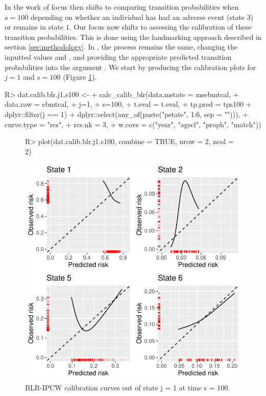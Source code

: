 \documentclass[nojss]{jss}
\begin{document}
In the work of \cite{DeWreede2011} focus then shifts to comparing transition probabilities when $s = 100$ depending on whether an individual has had an adverse event (state $3$) or remains in state $1$. Our focus now shifts to assessing the calibration of these transition probabilities. This is done using the landmarking approach described in section \ref{sec:methodology}. In , the process remains the same, changing the inputted values  and , and providing the appropriate predicted transition probabilities into the argument . We start by producing the calibration plots for $j = 1$ and $s = 100$ (Figure \ref{fig:blrj1s100}).

\begin{Schunk}
\begin{Sinput}
R> dat.calib.blr.j1.s100 <-
+    calc_calib_blr(data.mstate = msebmtcal,
+                   data.raw = ebmtcal,
+                   j=1,
+                   s=100,
+                   t.eval = t.eval,
+                   tp.pred = tps100 %
+                     dplyr::filter(j == 1) %
+                     dplyr::select(any_of(paste("pstate", 1:6, sep = ""))),
+                   curve.type = "rcs",
+                   rcs.nk = 3,
+                   w.covs = c("year", "agecl", "proph", "match"))
\end{Sinput}
\end{Schunk}

\begin{figure}
\centering
\begin{Schunk}
\begin{Sinput}
R> plot(dat.calib.blr.j1.s100, combine = TRUE, nrow = 2, ncol = 2)
\end{Sinput}
\end{Schunk}
\includegraphics{overview-010}
\caption{\label{fig:blrj1s100} BLR-IPCW calibration curves out of state j =  1 at time s = 100.}
\end{figure}
\end{document}
